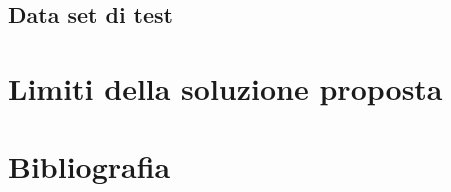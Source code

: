 \documentclass[a4paper,titlepage,openany,12pt]{book}
\begin{document}
\section{Data set di test}

\chapter{Limiti della soluzione proposta}

\chapter{Bibliografia}
\end{document}

